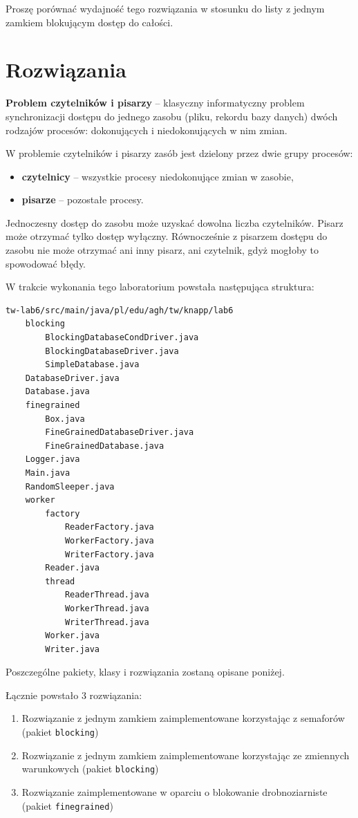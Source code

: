 \documentclass[11pt]{article}
\providecommand{\tightlist}{%
      \setlength{\itemsep}{0pt}\setlength{\parskip}{0pt}}
\begin{document}
Proszę porównać wydajność tego rozwiązania w stosunku do listy z jednym
zamkiem blokującym dostęp do całości.

    \hypertarget{rozwiux105zania}{%
\section{Rozwiązania}\label{rozwiux105zania}}

\textbf{Problem czytelników i pisarzy} -- klasyczny informatyczny
problem synchronizacji dostępu do jednego zasobu (pliku, rekordu bazy
danych) dwóch rodzajów procesów: dokonujących i niedokonujących w nim
zmian.

W problemie czytelników i pisarzy zasób jest dzielony przez dwie grupy
procesów:

\begin{itemize}
\tightlist
\item
  \textbf{czytelnicy} -- wszystkie procesy niedokonujące zmian w
  zasobie,
\item
  \textbf{pisarze} -- pozostałe procesy.
\end{itemize}

Jednoczesny dostęp do zasobu może uzyskać dowolna liczba czytelników.
Pisarz może otrzymać tylko dostęp wyłączny. Równocześnie z pisarzem
dostępu do zasobu nie może otrzymać ani inny pisarz, ani czytelnik, gdyż
mogłoby to spowodować błędy.

W trakcie wykonania tego laboratorium powstała następująca struktura:

\begin{verbatim}
tw-lab6/src/main/java/pl/edu/agh/tw/knapp/lab6
    blocking
        BlockingDatabaseCondDriver.java
        BlockingDatabaseDriver.java
        SimpleDatabase.java
    DatabaseDriver.java
    Database.java
    finegrained
        Box.java
        FineGrainedDatabaseDriver.java
        FineGrainedDatabase.java
    Logger.java
    Main.java
    RandomSleeper.java
    worker
        factory
            ReaderFactory.java
            WorkerFactory.java
            WriterFactory.java
        Reader.java
        thread
            ReaderThread.java
            WorkerThread.java
            WriterThread.java
        Worker.java
        Writer.java
\end{verbatim}

Poszczególne pakiety, klasy i rozwiązania zostaną opisane poniżej.

Łącznie powstało 3 rozwiązania:

\begin{enumerate}
\def\labelenumi{\arabic{enumi}.}
\tightlist
\item
  Rozwiązanie z jednym zamkiem zaimplementowane korzystając z semaforów
  (pakiet \texttt{blocking})
\item
  Rozwiązanie z jednym zamkiem zaimplementowane korzystając ze zmiennych
  warunkowych (pakiet \texttt{blocking})
\item
  Rozwiązanie zaimplementowane w oparciu o blokowanie drobnoziarniste
  (pakiet \texttt{finegrained})
\end{enumerate}
\end{document}
